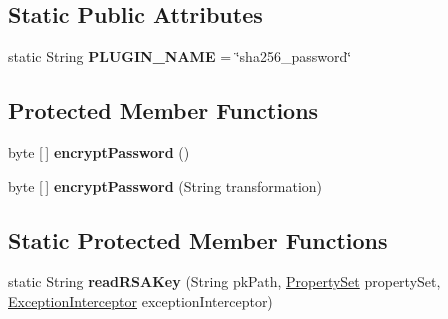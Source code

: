 \subsection*{Static Public Attributes}
\begin{DoxyCompactItemize}
\item 
\mbox{\label{classcom_1_1mysql_1_1cj_1_1protocol_1_1a_1_1authentication_1_1_sha256_password_plugin_a8f15b1a2fa7390d4725037b171fd13a7}} 
static String {\bfseries P\+L\+U\+G\+I\+N\+\_\+\+N\+A\+ME} = \char`\"{}sha256\+\_\+password\char`\"{}
\end{DoxyCompactItemize}
\subsection*{Protected Member Functions}
\begin{DoxyCompactItemize}
\item 
\mbox{\label{classcom_1_1mysql_1_1cj_1_1protocol_1_1a_1_1authentication_1_1_sha256_password_plugin_a3a794d3a2b11d2227a8ed2c9eef79317}} 
byte \mbox{[}$\,$\mbox{]} {\bfseries encrypt\+Password} ()
\item 
\mbox{\label{classcom_1_1mysql_1_1cj_1_1protocol_1_1a_1_1authentication_1_1_sha256_password_plugin_ae7d17c377f61765009f7d3ad92638f14}} 
byte \mbox{[}$\,$\mbox{]} {\bfseries encrypt\+Password} (String transformation)
\end{DoxyCompactItemize}
\subsection*{Static Protected Member Functions}
\begin{DoxyCompactItemize}
\item 
\mbox{\label{classcom_1_1mysql_1_1cj_1_1protocol_1_1a_1_1authentication_1_1_sha256_password_plugin_a8c1b80061a111fd0e8e3518af26baeef}} 
static String {\bfseries read\+R\+S\+A\+Key} (String pk\+Path, \mbox{\hyperlink{interfacecom_1_1mysql_1_1cj_1_1conf_1_1_property_set}{Property\+Set}} property\+Set, \mbox{\hyperlink{interfacecom_1_1mysql_1_1cj_1_1exceptions_1_1_exception_interceptor}{Exception\+Interceptor}} exception\+Interceptor)
\end{DoxyCompactItemize}
